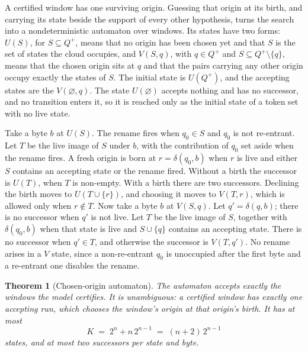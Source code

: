 \documentclass[11pt,a4paper]{article}
\theoremstyle{definition}
\theoremstyle{plain}
\newtheorem{theorem}{Theorem}
\begin{document}
A certified window has one surviving origin. Guessing that origin at its birth, and carrying its state beside the
support of every other hypothesis, turns the search into a nondeterministic automaton over windows. Its states have two
forms: $U(S)$, for $S \subseteq Q^+$, means that no origin has been chosen yet and that $S$ is the set of states the
cloud occupies, and $V(S, q)$, with $q \in Q^+$ and $S \subseteq Q^+ \setminus \{q\}$, means that the chosen origin sits
at $q$ and that the pairs carrying any other origin occupy exactly the states of $S$. The initial state is $U(Q^+)$, and
the accepting states are the $V(\varnothing, q)$. The state $U(\varnothing)$ accepts nothing and has no successor, and
no transition enters it, so it is reached only as the initial state of a token set with no live state.

Take a byte $b$ at $U(S)$. The rename fires when $q_0 \in S$ and $q_0$ is not re-entrant. Let $T$ be the live image of
$S$ under $b$, with the contribution of $q_0$ set aside when the rename fires. A fresh origin is born at
$r = \delta(q_0, b)$ when $r$ is live and either $S$ contains an accepting state or the rename fired. Without a birth
the successor is $U(T)$, when $T$ is non-empty. With a birth there are two successors. Declining the birth moves to
$U(T \cup \{r\})$, and choosing it moves to $V(T, r)$, which is allowed only when $r \notin T$. Now take a byte $b$ at
$V(S, q)$. Let $q' = \delta(q, b)$; there is no successor when $q'$ is not live. Let $T$ be the live image of $S$,
together with $\delta(q_0, b)$ when that state is live and $S \cup \{q\}$ contains an accepting state. There is no
successor when $q' \in T$, and otherwise the successor is $V(T, q')$. No rename arises in a $V$ state, since a
non-re-entrant $q_0$ is unoccupied after the first byte and a re-entrant one disables the rename.

\begin{theorem}[Chosen-origin automaton]
\label{thm:chosen}
The automaton accepts exactly the windows the model certifies. It is unambiguous: a certified window has exactly one
accepting run, which chooses the window's origin at that origin's birth. It has at most
\[ K \;=\; 2^n + n\, 2^{n-1} \;=\; (n + 2)\, 2^{n-1} \]
states, and at most two successors per state and byte.
\end{theorem}
\end{document}
